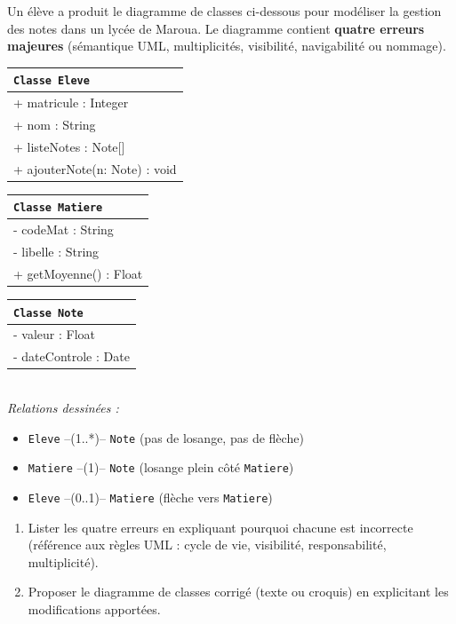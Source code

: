 \documentclass[11pt]{article}
\begin{document}
\begin{exercice}
Un élève a produit le diagramme de classes ci-dessous pour modéliser la gestion des notes dans un lycée de Maroua. Le diagramme contient \textbf{quatre erreurs majeures} (sémantique UML, multiplicités, visibilité, navigabilité ou nommage).
\begin{center}
\begin{tabular}{|l|}
\hline
\texttt{Classe Eleve} \\
\hline
+ matricule : Integer \\
+ nom : String \\
+ listeNotes : Note[] \\
\hline
+ ajouterNote(n: Note) : void \\
\hline
\end{tabular}
\quad
\begin{tabular}{|l|}
\hline
\texttt{Classe Matiere} \\
\hline
- codeMat : String \\
- libelle : String \\
\hline
+ getMoyenne() : Float \\
\hline
\end{tabular}
\quad
\begin{tabular}{|l|}
\hline
\texttt{Classe Note} \\
\hline
- valeur : Float \\
- dateControle : Date \\
\hline
\hline
\end{tabular}
\\[1em]
\textit{Relations dessinées :}
\begin{itemize}
    \item \texttt{Eleve} --(1..*)-- \texttt{Note} (pas de losange, pas de flèche)
    \item \texttt{Matiere} --(1)-- \texttt{Note} (losange plein côté \texttt{Matiere})
    \item \texttt{Eleve} --(0..1)-- \texttt{Matiere} (flèche vers \texttt{Matiere})
\end{itemize}
\end{center}
\begin{enumerate}
    \item Lister les quatre erreurs en expliquant pourquoi chacune est incorrecte (référence aux règles UML : cycle de vie, visibilité, responsabilité, multiplicité).
    \item Proposer le diagramme de classes corrigé (texte ou croquis) en explicitant les modifications apportées.
\end{enumerate}
\end{exercice}
\end{document}
